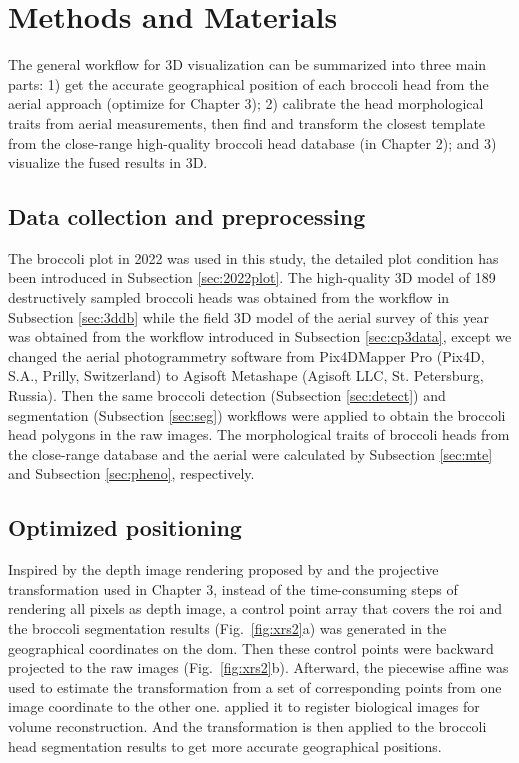\section{Methods and Materials}

The general workflow for 3D visualization can be summarized into three main parts: 1) get the accurate geographical position of each broccoli head from the aerial approach (optimize for Chapter 3); 2) calibrate the head morphological traits from aerial measurements, then find and transform the closest template from the close-range high-quality broccoli head database (in Chapter 2); and 3) visualize the fused results in 3D.

\subsection{Data collection and preprocessing}

The broccoli plot in 2022 was used in this study, the detailed plot condition has been introduced in Subsection \ref{sec:2022plot}. The high-quality 3D model of 189 destructively sampled broccoli heads was obtained from the workflow in Subsection \ref{sec:3ddb} while the field 3D model of the aerial survey of this year was obtained from the workflow introduced in Subsection \ref{sec:cp3data}, except we changed the aerial photogrammetry software from Pix4DMapper Pro (Pix4D, S.A., Prilly, Switzerland) to Agisoft Metashape (Agisoft LLC, St. Petersburg, Russia). Then the same broccoli detection (Subsection \ref{sec:detect}) and segmentation (Subsection \ref{sec:seg}) workflows were applied to obtain the broccoli head polygons in the raw images. The morphological traits of broccoli heads from the close-range database and the aerial were calculated by Subsection \ref{sec:mte} and Subsection \ref{sec:pheno}, respectively.

\subsection{Optimized positioning}

Inspired by the depth image rendering proposed by \citet{shao_cattle_2020} and the projective transformation used in Chapter 3, instead of the time-consuming steps of rendering all pixels as depth image, a control point array that covers the \gls{roi} and the broccoli segmentation results (Fig.~\ref{fig:xrs2}a) was generated in the geographical coordinates on the \gls{dom}. Then these control points were backward projected to the raw images (Fig.~\ref{fig:xrs2}b). Afterward, the piecewise affine was used to estimate the transformation from a set of corresponding points from one image coordinate to the other one. \citet{pitiot_piecewise_2006} applied it to register biological images for volume reconstruction. And the transformation is then applied to the broccoli head segmentation results to get more accurate geographical positions.

